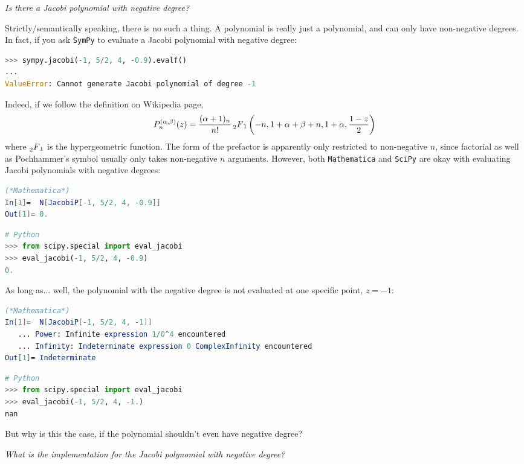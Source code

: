 \noindent\textit{Is there a Jacobi polynomial with negative degree?}

Strictly/semantically speaking, there is no such a thing.
A polynomial is really just a polynomial, and can only have non-negative degrees.
In fact, if you ask \texttt{SymPy} to evaluate a Jacobi polynomial with negative degree:
\begin{lstlisting}[language=Python]
>>> sympy.jacobi(-1, 5/2, 4, -0.9).evalf()
...
ValueError: Cannot generate Jacobi polynomial of degree -1
\end{lstlisting}
Indeed, if we follow the definition on Wikipedia page,
\[
    P_n^{(\alpha,\beta)}(z) = \frac{(\alpha + 1)_n}{n!}\prescript{}{2}{F}_1\left(-n, 1+\alpha+\beta+n, 1+\alpha, \frac{1-z}{2}\right)
\]
where $\prescript{}{2}{F}_1$ is the hypergeometric function.
The form of the prefactor is apparently only restricted to non-negative $n$, since factorial as well as Pochhammer's symbol usually only takes non-negative $n$ arguments.
However, both \texttt{Mathematica} and \texttt{SciPy} are okay with evaluating Jacobi polynomials with negative degrees:
\begin{lstlisting}[language=Mathematica]
(*Mathematica*)
In[1]=  N[JacobiP[-1, 5/2, 4, -0.9]]
Out[1]= 0.
\end{lstlisting}
\begin{lstlisting}[language=Python]
# Python
>>> from scipy.special import eval_jacobi
>>> eval_jacobi(-1, 5/2, 4, -0.9)
0.
\end{lstlisting}
As long as... well, the polynomial with the negative degree is not evaluated at one specific point, $z=-1$:
\begin{lstlisting}[language=Mathematica]
(*Mathematica*)
In[1]=  N[JacobiP[-1, 5/2, 4, -1]]
   ... Power: Infinite expression 1/0^4 encountered
   ... Infinity: Indeterminate expression 0 ComplexInfinity encountered
Out[1]= Indeterminate
\end{lstlisting}
\begin{lstlisting}[language=Python]
# Python
>>> from scipy.special import eval_jacobi
>>> eval_jacobi(-1, 5/2, 4, -1.)
nan
\end{lstlisting}
But why is this the case, if the polynomial shouldn't even have negative degree?
\vspace{1em}

\noindent\textit{What is the implementation for the Jacobi polynomial with negative degree?}

